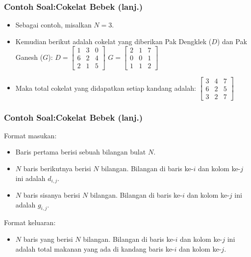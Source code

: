\documentclass{beamer}
\begin{document}
\begin{frame}
\frametitle{Contoh Soal:\newline Cokelat Bebek (lanj.)}
\begin{itemize}
    \item Sebagai contoh, misalkan $N = 3$.
    \item Kemudian berikut adalah cokelat yang diberikan Pak Dengklek ($D$) dan Pak Ganesh ($G$):
    \vfill
    \(D =
    \left[\begin{matrix}
    1 & 3 & 0 \\
    6 & 2 & 4 \\
    2 & 1 & 5
    \end{matrix}\right]
    \)
    \hfil
    \(G =
    \left[\begin{matrix}
    2 & 1 & 7 \\
    0 & 0 & 1 \\
    1 & 1 & 2
    \end{matrix}\right]
    \) \centering
    \item Maka total cokelat yang didapatkan setiap kandang adalah:
    \vfill
    \(
    \left[\begin{matrix}
    3 & 4 & 7 \\
    6 & 2 & 5 \\
    3 & 2 & 7
    \end{matrix}\right]
    \) \centering
\end{itemize}
\end{frame}

\begin{frame}
\frametitle{Contoh Soal:\newline Cokelat Bebek (lanj.)}
Format masukan:
\begin{itemize}
    \item Baris pertama berisi sebuah bilangan bulat $N$.
    \item $N$ baris berikutnya berisi $N$ bilangan. Bilangan di baris ke-$i$ dan kolom ke-$j$ ini adalah $d_{i,j}$.
    \item $N$ baris sisanya berisi $N$ bilangan. Bilangan di baris ke-$i$ dan kolom ke-$j$ ini adalah $g_{i,j}$.
\end{itemize}
Format keluaran:
\begin{itemize}
    \item $N$ baris yang berisi $N$ bilangan. Bilangan di baris ke-$i$ dan kolom ke-$j$ ini adalah total makanan yang ada di kandang baris ke-$i$ dan kolom ke-$j$.
\end{itemize}
\end{frame}
\end{document}
